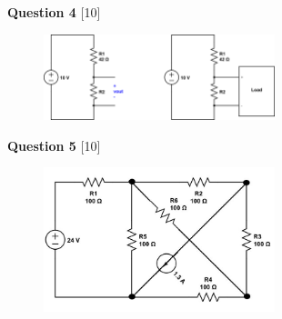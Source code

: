 \documentclass[12pt]{article}
\begin{document}
{\bf Question 4} [10] %

\begin{figure}[!h]
  \centering 
  \includegraphics[clip,width=0.6\textwidth]{mid1_3.png}
\end{figure}

{\bf Question 5} [10] %

\begin{figure}[h!]
\centering 
\includegraphics[clip,width=0.6\textwidth]{mid1_5.jpg}
\end{figure}
\end{document}
